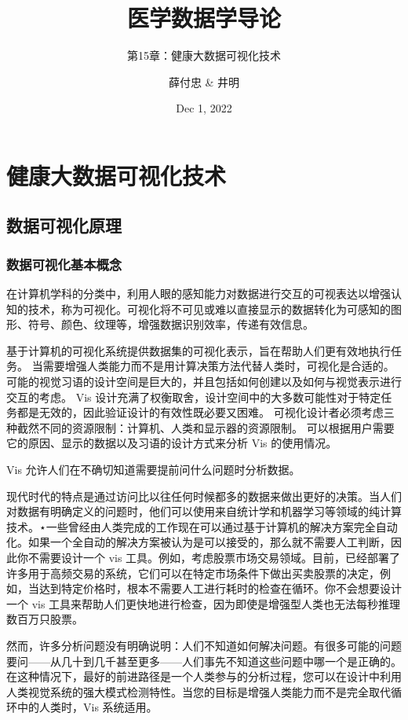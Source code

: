 \documentclass[lang=cn,color=black,10pt,founder,newtx]{elegantbook}
\title{医学数据学导论}
\subtitle{第15章：健康大数据可视化技术}
\author{薛付忠 \& 井明}
\institute{医学大数据学院}
\date{Dec 1, 2022}
\begin{document}
\maketitle
\frontmatter

\tableofcontents

\mainmatter

\setcounter{chapter}{14}
\chapter{健康大数据可视化技术}

\section{数据可视化原理}

\subsection{数据可视化基本概念}


在计算机学科的分类中，利用人眼的感知能力对数据进行交互的可视表达以增强认知的技术，称为可视化。可视化将不可见或难以直接显示的数据转化为可感知的图形、符号、颜色、纹理等，增强数据识别效率，传递有效信息。


基于计算机的可视化系统提供数据集的可视化表示，旨在帮助人们更有效地执行任务。
当需要增强人类能力而不是用计算决策方法代替人类时，可视化是合适的。可能的视觉习语的设计空间是巨大的，并且包括如何创建以及如何与视觉表示进行交互的考虑。 Vis 设计充满了权衡取舍，设计空间中的大多数可能性对于特定任务都是无效的，因此验证设计的有效性既必要又困难。 可视化设计者必须考虑三种截然不同的资源限制：计算机、人类和显示器的资源限制。 可以根据用户需要它的原因、显示的数据以及习语的设计方式来分析 Vis 的使用情况。

Vis 允许人们在不确切知道需要提前问什么问题时分析数据。

现代时代的特点是通过访问比以往任何时候都多的数据来做出更好的决策。当人们对数据有明确定义的问题时，他们可以使用来自统计学和机器学习等领域的纯计算技术。⋆一些曾经由人类完成的工作现在可以通过基于计算机的解决方案完全自动化。如果一个全自动的解决方案被认为是可以接受的，那么就不需要人工判断，因此你不需要设计一个 vis 工具。例如，考虑股票市场交易领域。目前，已经部署了许多用于高频交易的系统，它们可以在特定市场条件下做出买卖股票的决定，例如，当达到特定价格时，根本不需要人工进行耗时的检查在循环。你不会想要设计一个 vis 工具来帮助人们更快地进行检查，因为即使是增强型人类也无法每秒推理数百万只股票。

然而，许多分析问题没有明确说明：人们不知道如何解决问题。有很多可能的问题要问——从几十到几千甚至更多——人们事先不知道这些问题中哪一个是正确的。在这种情况下，最好的前进路径是一个人类参与的分析过程，您可以在设计中利用人类视觉系统的强大模式检测特性。当您的目标是增强人类能力而不是完全取代循环中的人类时，Vis 系统适用。
\end{document}
